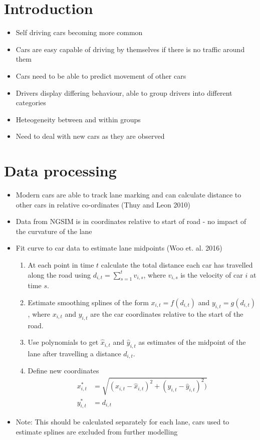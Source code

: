 \documentclass[12pt,a4paper]{article}\usepackage[]{graphicx}\usepackage[]{color}
\begin{document}
\section{Introduction}

\begin{itemize}
\item Self driving cars becoming more common
\item Cars are easy capable of driving by themselves if there is no traffic around them
\item Cars need to be able to predict movement of other cars
\item Drivers display differing behaviour, able to group drivers into different categories
\item Heteogeneity between and within groups
\item Need to deal with new cars as they are observed
\end{itemize}

\section{Data processing}

\begin{itemize}
\item Modern cars are able to track lane marking and can calculate distance to other cars in relative co-ordinates (Thuy and Leon 2010)
\item Data from NGSIM is in coordinates relative to start of road - no impact of the curvature of the lane
\item Fit curve to car data to estimate lane midpoints (Woo et. al. 2016) 
\begin{enumerate}
\item At each point in time $t$ calculate the total distance each car has travelled along the road using $d_{i, t} = \sum_{s=1}^t v_{i, s}$, where $v_{i, s}$ is the velocity of car $i$ at time $s$. 
\item Estimate smoothing splines of the form $x_{i, t} = f(d_{i, t})$ and $y_{i, t} = g(d_{i, t})$, where $x_{i, t}$ and $y_{i, t}$ are the car coordinates relative to the start of the road.
\item Use polynomials to get $\hat{x}_{i, t}$ and $\hat{y}_{i, t}$ as estimates of the midpoint of the lane after travelling a distance $d_{i, t}$.
\item Define new coordinates 
\begin{align}
x^*_{i, t} &= \sqrt{(x_{i, t}-\hat{x}_{i, t})^2 + (y_{i, t} - \hat{y}_{i, t})^2)} \label{xRel} \\
y^*_{i, t} &= d_{i, t} \label{yRel}
\end{align}
\end{enumerate}
\item Note: This should be calculated separately for each lane, cars used to estimate splines are excluded from further modelling
\end{itemize}
\end{document}
